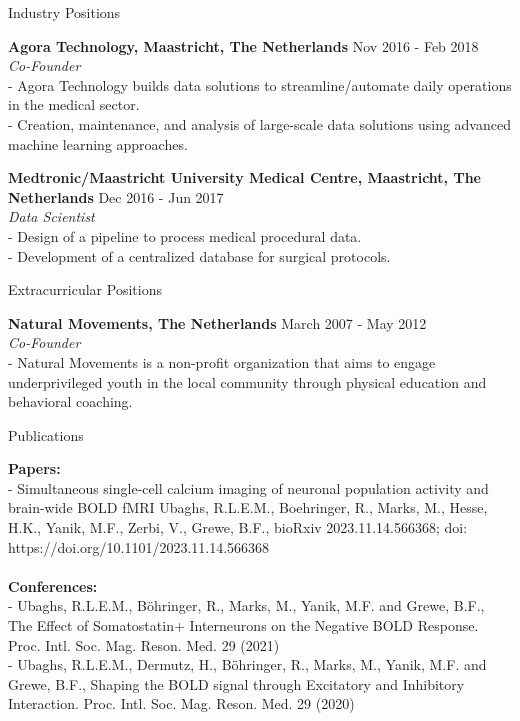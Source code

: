 \documentclass{resume}
\begin{document}
\begin{sections}{Industry Positions}

{\bf Agora Technology, Maastricht, The Netherlands} \hfill {Nov 2016 - Feb 2018} 
\\{\textit{Co-Founder}}
\\- Agora Technology builds data solutions to streamline/automate daily operations in the medical sector.
\\- Creation, maintenance, and analysis of large-scale data solutions using advanced machine learning approaches.

{\bf Medtronic/Maastricht University Medical Centre, Maastricht, The Netherlands} \hfill {Dec 2016 - Jun 2017} 
\\{\textit{Data Scientist}}
\\- Design of a pipeline to process medical procedural data.
\\- Development of a centralized database for surgical protocols.

\end{sections}

\cleardoublepage

\begin{sections}{Extracurricular Positions}

{\bf Natural Movements, The Netherlands} \hfill {March 2007 - May 2012} 
\\{\textit{Co-Founder}}
\\- Natural Movements is a non-profit organization that aims to engage underprivileged youth in the local community through physical education and behavioral coaching.

\end{sections}

\begin{sections}{Publications}

{\bf Papers:}
\\
{- Simultaneous single-cell calcium imaging of neuronal population activity and brain-wide BOLD fMRI
Ubaghs, R.L.E.M., Boehringer, R., Marks, M., Hesse, H.K., Yanik, M.F., Zerbi, V., Grewe, B.F., bioRxiv 2023.11.14.566368; doi: https://doi.org/10.1101/2023.11.14.566368}
\\
\\
{\bf Conferences:}
\\{- Ubaghs, R.L.E.M., Böhringer, R., Marks, M., Yanik, M.F. and Grewe, B.F., The Effect of Somatostatin+ Interneurons on the Negative BOLD Response. Proc. Intl. Soc. Mag. Reson. Med. 29 (2021)}
\\{- Ubaghs, R.L.E.M., Dermutz, H., Böhringer, R., Marks, M., Yanik, M.F. and Grewe, B.F., Shaping the BOLD signal through Excitatory and Inhibitory Interaction. Proc. Intl. Soc. Mag. Reson. Med. 29 (2020)}

\end{sections}
\end{document}
